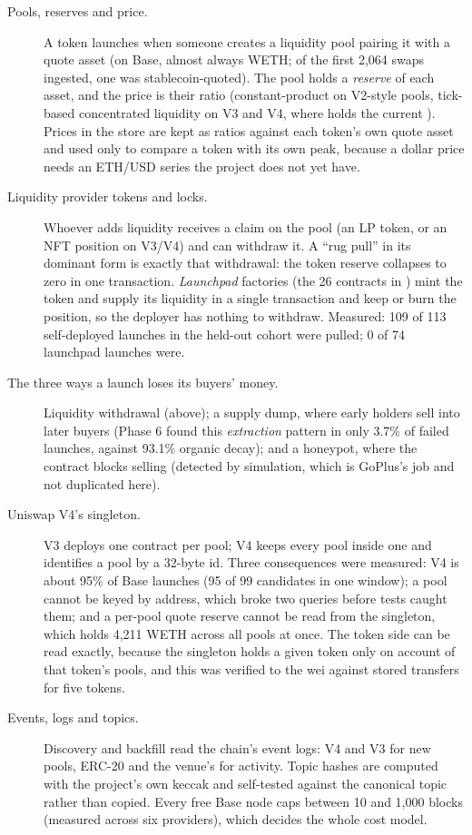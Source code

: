 \begin{description}
  \item[Pools, reserves and price.] A token launches when someone creates a liquidity pool pairing it with a quote asset (on Base, almost always WETH; of the first 2,064 swaps ingested, one was stablecoin-quoted). The pool holds a \emph{reserve} of each asset, and the price is their ratio (constant-product on V2-style pools, tick-based concentrated liquidity on V3 and V4, where  holds the current ). Prices in the store are kept as ratios against each token's own quote asset and used only to compare a token with its own peak, because a dollar price needs an ETH/USD series the project does not yet have.
  \item[Liquidity provider tokens and locks.] Whoever adds liquidity receives a claim on the pool (an LP token, or an NFT position on V3/V4) and can withdraw it. A ``rug pull'' in its dominant form is exactly that withdrawal: the token reserve collapses to zero in one transaction. \emph{Launchpad} factories (the 26 contracts in ) mint the token and supply its liquidity in a single transaction and keep or burn the position, so the deployer has nothing to withdraw. Measured: 109 of 113 self-deployed launches in the held-out cohort were pulled; 0 of 74 launchpad launches were.
  \item[The three ways a launch loses its buyers' money.] Liquidity withdrawal (above); a supply dump, where early holders sell into later buyers (Phase 6 found this \emph{extraction} pattern in only 3.7\% of failed launches, against 93.1\% organic decay); and a honeypot, where the contract blocks selling (detected by simulation, which is GoPlus's job and not duplicated here).
  \item[Uniswap V4's singleton.] V3 deploys one contract per pool; V4 keeps every pool inside one  and identifies a pool by a 32-byte id. Three consequences were measured: V4 is about 95\% of Base launches (95 of 99 candidates in one window); a pool cannot be keyed by address, which broke two queries before tests caught them; and a per-pool quote reserve cannot be read from the singleton, which holds 4,211 WETH across all pools at once. The token side can be read exactly, because the singleton holds a given token only on account of that token's pools, and this was verified to the wei against stored transfers for five tokens.
  \item[Events, logs and topics.] Discovery and backfill read the chain's event logs: V4  and V3  for new pools, ERC-20  and the venue's  for activity. Topic hashes are computed with the project's own keccak and self-tested against the canonical  topic rather than copied. Every free Base node caps  between 10 and 1,000 blocks (measured across six providers), which decides the whole cost model.

\end{description}
